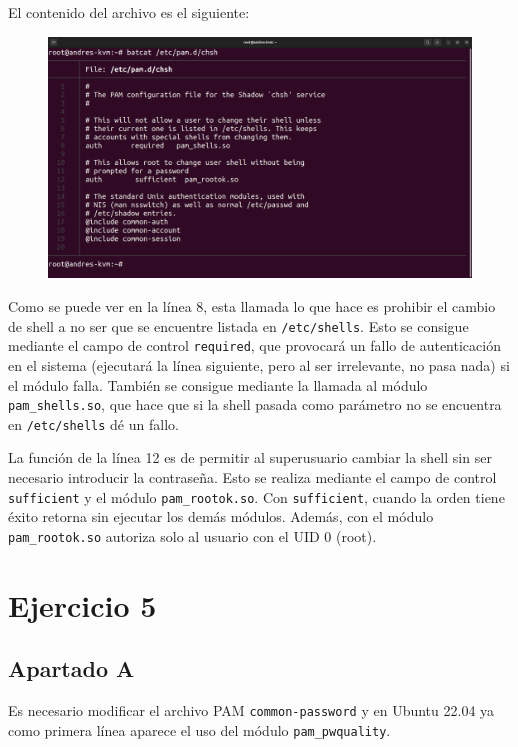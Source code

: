 \documentclass{article}
\begin{document}
\bigskip

El contenido del archivo es el siguiente:

\begin{figure}[H]
    \includegraphics[width=\textwidth]{imagenes/pamchsh.png}
\end{figure}


Como se puede ver en la línea 8, esta llamada lo que hace es prohibir el cambio de shell a no ser que se encuentre listada en \verb|/etc/shells|. Esto se consigue mediante el campo de control \verb|required|, que provocará un fallo de autenticación en el sistema (ejecutará la línea siguiente, pero al ser irrelevante, no pasa nada) si el módulo falla. También se consigue mediante la llamada al módulo \verb|pam_shells.so|, que hace que si la shell pasada como parámetro no se encuentra en \verb|/etc/shells| dé un fallo.

\bigskip

La función de la línea 12 es de permitir al superusuario cambiar la shell sin ser necesario introducir la contraseña. Esto se realiza mediante el campo de control \verb|sufficient| y el módulo \verb|pam_rootok.so|. Con \verb|sufficient|, cuando la orden tiene éxito retorna sin ejecutar los demás módulos. Además, con el módulo \verb|pam_rootok.so| autoriza solo al usuario con el UID 0 (root).


\newpage

\section*{Ejercicio 5}
\subsection*{Apartado A}
Es necesario modificar el archivo PAM \verb|common-password| y en Ubuntu 22.04 ya como primera línea aparece el uso del módulo \verb|pam_pwquality|. 
\end{document}
